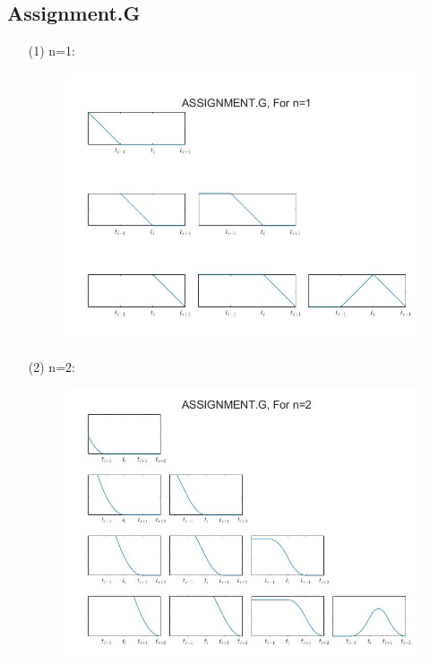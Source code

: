 \documentclass[a4paper,11.5pt,UTF8]{ctexart}
\begin{document}
\begin{large}
\subsection{Assignment.G}
\begin{itemize}
	\item[(1)] n=1:
	\begin{figure}[H]
		\centering
		\includegraphics[scale=0.6]{../plot/figure/figure_G_1.jpg}
	\end{figure}
	\item[(2)] n=2:
	\begin{figure}[H]
		\centering
		\includegraphics[scale=0.6]{../plot/figure/figure_G_2.jpg}
	\end{figure}
\end{itemize}

\end{large}
\end{document}
